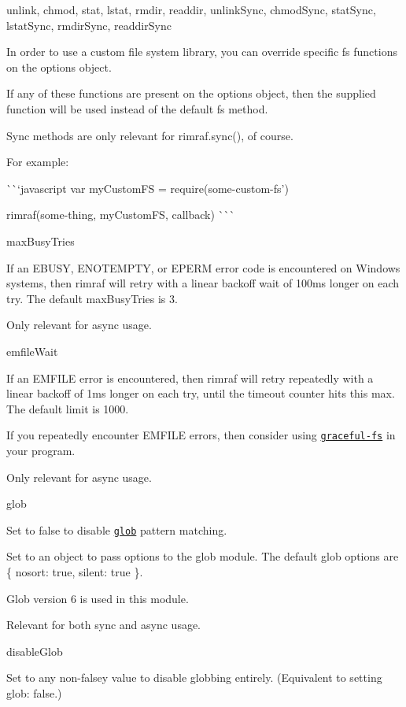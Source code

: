 \begin{DoxyItemize}
\item unlink, chmod, stat, lstat, rmdir, readdir, unlink\+Sync, chmod\+Sync, stat\+Sync, lstat\+Sync, rmdir\+Sync, readdir\+Sync

In order to use a custom file system library, you can override specific fs functions on the options object.

If any of these functions are present on the options object, then the supplied function will be used instead of the default fs method.

Sync methods are only relevant for {\ttfamily rimraf.\+sync()}, of course.

For example\+:

\`{}\`{}`javascript var my\+Custom\+FS = require(\textquotesingle{}some-\/custom-\/fs')

rimraf(\textquotesingle{}some-\/thing\textquotesingle{}, my\+Custom\+FS, callback) \`{}\`{}\`{}
\item max\+Busy\+Tries

If an {\ttfamily E\+B\+U\+SY}, {\ttfamily E\+N\+O\+T\+E\+M\+P\+TY}, or {\ttfamily E\+P\+E\+RM} error code is encountered on Windows systems, then rimraf will retry with a linear backoff wait of 100ms longer on each try. The default max\+Busy\+Tries is 3.

Only relevant for async usage.
\item emfile\+Wait

If an {\ttfamily E\+M\+F\+I\+LE} error is encountered, then rimraf will retry repeatedly with a linear backoff of 1ms longer on each try, until the timeout counter hits this max. The default limit is 1000.

If you repeatedly encounter {\ttfamily E\+M\+F\+I\+LE} errors, then consider using \href{http://npm.im/graceful-fs}{\tt graceful-\/fs} in your program.

Only relevant for async usage.
\item glob

Set to {\ttfamily false} to disable \href{http://npm.im/glob}{\tt glob} pattern matching.

Set to an object to pass options to the glob module. The default glob options are {\ttfamily \{ nosort\+: true, silent\+: true \}}.

Glob version 6 is used in this module.

Relevant for both sync and async usage.
\item disable\+Glob

Set to any non-\/falsey value to disable globbing entirely. (Equivalent to setting {\ttfamily glob\+: false}.)
\end{DoxyItemize}

